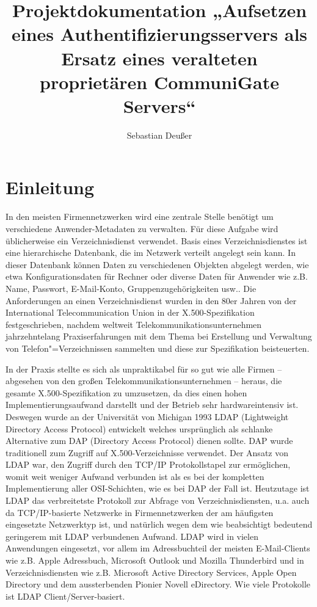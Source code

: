 \documentclass[11pt,a4paper,titlepage=firstiscover,headsepline,bibtotoc]{scrartcl} %
\title{Projektdokumentation „Aufsetzen eines Authentifizierungsservers als Ersatz eines veralteten proprietären CommuniGate Servers“}
\author{Sebastian Deußer}
\begin{document}
\pagestyle{empty}


\tableofcontents
\newpage
\setcounter{page}{1}  %
\pagestyle{scrheadings}

\section{Einleitung}
In den meisten Firmennetzwerken wird eine zentrale Stelle benötigt um verschiedene Anwender-Metadaten zu verwalten. Für diese Aufgabe wird üblicherweise ein Verzeichnisdienst verwendet. Basis eines Verzeichnisdienstes ist eine hierarchische Datenbank, die im Netzwerk verteilt angelegt sein kann. In dieser Datenbank können Daten zu verschiedenen Objekten abgelegt werden, wie etwa Konfigurationsdaten für Rechner oder diverse Daten für Anwender wie z.B. Name, Passwort, E-Mail-Konto, Gruppenzugehörigkeiten usw.. Die Anforderungen an einen Verzeichnisdienst wurden in den 80er Jahren von der International Telecommunication Union in der X.500-Spezifikation festgeschrieben, nachdem weltweit Telekommunikationsunternehmen jahrzehntelang Praxiserfahrungen mit dem Thema bei Erstellung und Verwaltung von Telefon"=Verzeichnissen sammelten und diese zur Spezifikation beisteuerten.

In der Praxis stellte es sich als unpraktikabel für so gut wie alle Firmen -- abgesehen von den großen Telekommunikationsunternehmen -- heraus, die gesamte X.500-Spezifikation zu umzusetzen, da dies einen hohen Implementierungsaufwand darstellt und der Betrieb sehr hardwareintensiv ist. Deswegen wurde an der Universität von Michigan 1993 LDAP (Lightweight Directory Access Protocol) entwickelt welches ursprünglich als schlanke Alternative zum DAP (Directory Access Protocol) dienen sollte. DAP wurde traditionell zum Zugriff auf X.500-Verzeichnisse verwendet. Der Ansatz von LDAP war, den Zugriff durch den TCP/IP Protokollstapel zur ermöglichen, womit weit weniger Aufwand verbunden ist als es bei der kompletten Implementierung aller OSI-Schichten, wie es bei DAP der Fall ist. Heutzutage ist LDAP das verbreitetste Protokoll zur Abfrage von Verzeichnisdiensten, u.a. auch da TCP/IP-basierte Netzwerke in Firmennetzwerken der am häufigsten eingesetzte Netzwerktyp ist, und natürlich wegen dem wie beabsichtigt bedeutend geringerem mit LDAP verbundenen Aufwand. LDAP wird in vielen Anwendungen eingesetzt, vor allem im Adressbuchteil der meisten E-Mail-Clients wie z.B. Apple Adressbuch, Microsoft Outlook und Mozilla Thunderbird und in Verzeichnisdiensten wie z.B. Microsoft Active Directory Services, Apple Open Directory und dem aussterbenden Pionier Novell eDirectory. Wie viele Protokolle ist LDAP Client/Server-basiert.
\end{document}
